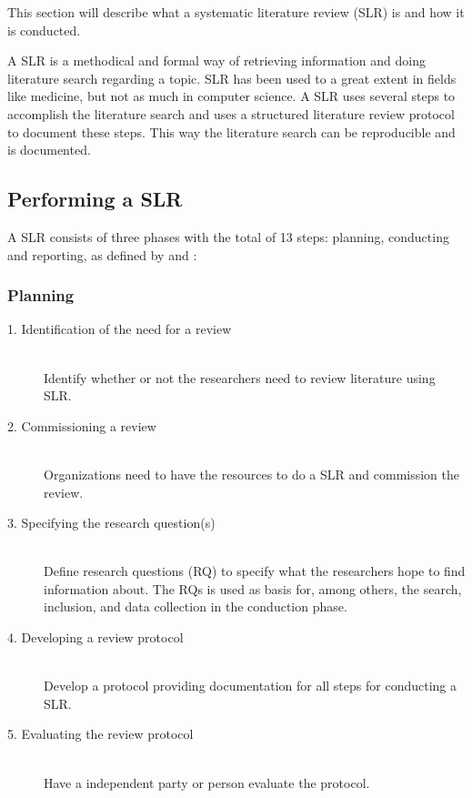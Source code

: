 This section will describe what a systematic literature review (SLR) is and how it is conducted. 

A SLR is a methodical and formal way of retrieving information and doing literature search regarding a topic. SLR has been used to a great extent in fields like medicine, but not as much in computer science. A SLR uses several steps to accomplish the literature search and uses a structured literature review protocol to document these steps. This way the literature search can be reproducible and is documented. \citep{paper:slrdesc}

\subsection{Performing a SLR}

A SLR consists of three phases with the total of 13 steps: planning, conducting and reporting, as defined by \cite{paper:slrdesc} and \cite{master:slr}:

\subsubsection{Planning}

\begin{description}

	\item[1. Identification of the need for a review] \hfill \\
		Identify whether or not the researchers need to review literature using SLR.

	\item[2. Commissioning a review] \hfill \\
		Organizations need to have the resources to do a SLR and commission the review.

	\item[3. Specifying the research question(s)] \hfill \\
		Define research questions (RQ) to specify what the researchers hope to find information about. The RQs is used as basis for, among others, the search, inclusion, and data collection in the conduction phase. 

	\item[4. Developing a review protocol] \hfill \\
		Develop a protocol providing documentation for all steps for conducting a SLR.
	

	\item[5. Evaluating the review protocol] \hfill \\
		Have a independent party or person evaluate the protocol.

\end{description}

